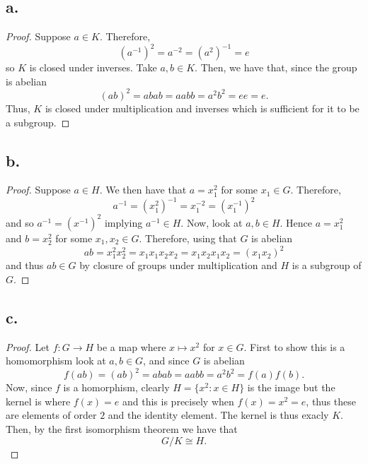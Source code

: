 \documentclass{article}
\begin{document}
\subsection*{a.}
\begin{proof}
Suppose $a \in K$. Therefore, \[\left(a^{-1}\right)^2 = a^{-2} = \left(a^{2}\right)^{-1} = e\]
so $K $ is closed under inverses. Take $a, b \in K$. Then, we have that, since the group is abelian
\[
   (ab)^2 = abab = aabb = a^2b^2 = ee = e.  
\]
Thus, $K$ is closed under multiplication and inverses which is sufficient for it to be a subgroup. 
\end{proof}
\subsection*{b.}
\begin{proof}
    Suppose $a \in H$. We then have that $a = x_1^2$ for some $x_1 \in G$. Therefore, 
    \[
    a^{-1} = \left(x_1^2\right)^{-1} = x_1^{-2} = (x_1^{-1})^2    
    \]
    and so $a^{-1} = \left(x^{-1} \right)^2$ implying $a^{-1} \in H$. Now, look at $a, b \in H$. Hence $a = x_1^2$ and $b = x_2^2$ for some $x_1, x_2 \in G$. Therefore, using that $G$ is abelian 
    \[
    ab = x_1^2x_2^2 = x_1x_1x_2x_2 = x_1x_2x_1x_2 = (x_1x_2)^2    
    \]
    and thus $ab \in G$ by closure of groups under multiplication and $H$ is a subgroup of $G$. 
\end{proof}
\subsection*{c.}
\begin{proof}
    Let $f:G \to H$ be a map where $x \mapsto x^2$ for $x \in G$. First to show this is a homomorphism look at $a, b \in G$, and since $G$ is abelian  
    \[
    f(ab) = (ab)^2 = abab = aabb = a^2b^2 = f(a)f(b).
    \]
    Now, since $f$ is a homorphism, clearly $H = \{x^2 : x \in H\}$ is the image but the kernel is where $f(x) = e$ and this is precisely when $f(x) =x^2 = e$, thus these are elements of order $2$ and the identity element. The kernel is thus exacly $K$. Then, by the first isomorphism theorem we have that \[
      G/K \cong H.   
    \]
\end{proof}
\end{document}

